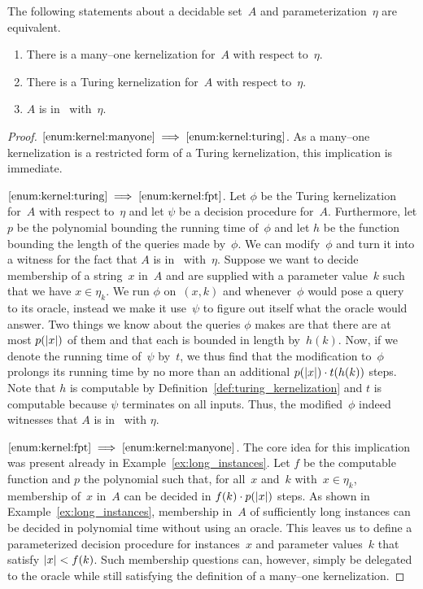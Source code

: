\begin{theorem}
\label{thm:kernel_fpt}%
  The following statements about a decidable set~$A$ and parameterization~$\eta$ are equivalent.
  \begin{enumerate}
  \item\label{enum:kernel:manyone}
    There is a many--one kernelization for~$A$ with respect to~$\eta$.
  \item\label{enum:kernel:turing}
    There is a Turing kernelization for~$A$ with respect to~$\eta$.
  \item\label{enum:kernel:fpt}
    $A$ is in~ with~$\eta$.
  \end{enumerate}
\end{theorem}
\begin{proof}
$\ref{enum:kernel:manyone} \implies \ref{enum:kernel:turing}$.
  As a many--one kernelization is a restricted form of a Turing kernelization, this implication is immediate.

$\ref{enum:kernel:turing} \implies \ref{enum:kernel:fpt}$.
  Let $\phi$ be the Turing kernelization for~$A$ with respect to~$\eta$ and let $\psi$ be a decision procedure for~$A$.
  Furthermore, let $p$ be the polynomial bounding the running time of~$\phi$ and let $h$ be the function bounding the length of the queries made by~$\phi$.
  We can modify~$\phi$ and turn it into a witness for the fact that $A$ is in~ with~$\eta$.
  Suppose we want to decide membership of a string~$x$ in~$A$ and are supplied with a parameter value~$k$ such that we have $x \in \eta_k$.
  We run $\phi$ on~$(x, k)$ and whenever~$\phi$ would pose a query to its oracle, instead we make it use~$\psi$ to figure out itself what the oracle would answer.
  Two things we know about the queries $\phi$ makes are that there are at most $p({\lvert x\rvert})$ of them and that each is bounded in length by~$h(k)$.
  Now, if we denote the running time of~$\psi$ by~$t$, we thus find that the modification to~$\phi$ prolongs its running time by no more than an additional $p({\lvert x\rvert}) \cdot t(h(k))$ steps.
  Note that $h$ is computable by Definition~\ref{def:turing_kernelization} and $t$ is computable because $\psi$ terminates on all inputs.
  Thus, the modified~$\phi$ indeed witnesses that $A$ is in~ with $\eta$.

$\ref{enum:kernel:fpt} \implies \ref{enum:kernel:manyone}$.
  The core idea for this implication was present already in Example~\ref{ex:long_instances}.
  Let $f$ be the computable function and $p$ the polynomial such that, for all~$x$ and~$k$ with~$x \in \eta_k$, membership of~$x$ in~$A$ can be decided in $f(k) \cdot p({\lvert x\rvert})$ steps.
  As shown in Example~\ref{ex:long_instances}, membership in~$A$ of sufficiently long instances can be decided in polynomial time without using an oracle.
  This leaves us to define a parameterized decision procedure for instances~$x$ and parameter values~$k$ that satisfy ${\lvert x\rvert} < f(k)$.
  Such membership questions can, however, simply be delegated to the oracle while still satisfying the definition of a many--one kernelization.
\end{proof}

